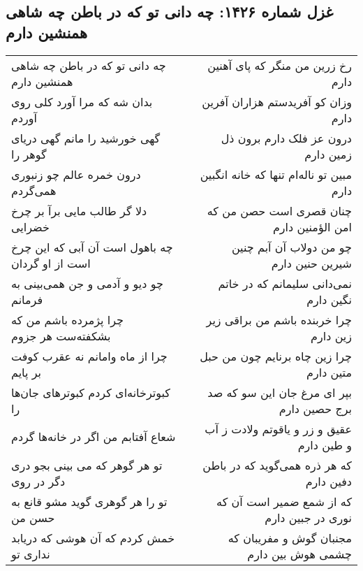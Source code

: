 \begin{center}
\section*{غزل شماره ۱۴۲۶: چه دانی تو که در باطن چه شاهی همنشین دارم}
\label{sec:1426}
\begin{longtable}{l p{0.5cm} r}
چه دانی تو که در باطن چه شاهی همنشین دارم
&&
رخ زرین من منگر که پای آهنین دارم
\\
بدان شه که مرا آورد کلی روی آوردم
&&
وزان کو آفریدستم هزاران آفرین دارم
\\
گهی خورشید را مانم گهی دریای گوهر را
&&
درون عز فلک دارم برون ذل زمین دارم
\\
درون خمره عالم چو زنبوری همی‌گردم
&&
مبین تو ناله‌ام تنها که خانه انگبین دارم
\\
دلا گر طالب مایی برآ بر چرخ خضرایی
&&
چنان قصری است حصن من که امن الؤمنین دارم
\\
چه باهول است آن آبی که این چرخ است از او گردان
&&
چو من دولاب آن آبم چنین شیرین حنین دارم
\\
چو دیو و آدمی و جن همی‌بینی به فرمانم
&&
نمی‌دانی سلیمانم که در خاتم نگین دارم
\\
چرا پژمرده باشم من که بشکفته‌ست هر جزوم
&&
چرا خربنده باشم من براقی زیر زین دارم
\\
چرا از ماه وامانم نه عقرب کوفت بر پایم
&&
چرا زین چاه برنایم چون من حبل متین دارم
\\
کبوترخانه‌ای کردم کبوترهای جان‌ها را
&&
بپر ای مرغ جان این سو که صد برج حصین دارم
\\
شعاع آفتابم من اگر در خانه‌ها گردم
&&
عقیق و زر و یاقوتم ولادت ز آب و طین دارم
\\
تو هر گوهر که می بینی بجو دری دگر در روی
&&
که هر ذره همی‌گوید که در باطن دفین دارم
\\
تو را هر گوهری گوید مشو قانع به حسن من
&&
که از شمع ضمیر است آن که نوری در جبین دارم
\\
خمش کردم که آن هوشی که دریابد نداری تو
&&
مجنبان گوش و مفریبان که چشمی هوش بین دارم
\\
\end{longtable}
\end{center}
